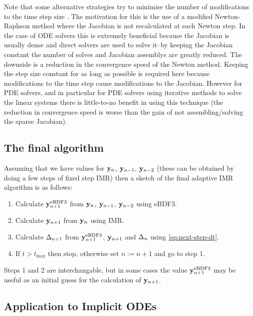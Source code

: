 Note that some alternative strategies try to minimise the number of modifications to the time step size \cite[chap. 6]{Iserles2009} \cite[Sec. 2.1]{cvode-manual}.
The motivation for this is the use of a modified Newton-Raphson method where the Jacobian is not recalculated at each Newton step.
In the case of ODE solvers this is extremely beneficial because the Jacobian is usually dense and direct solvers are used to solve it--by keeping the Jacobian constant the number of solves and Jacobian assemblys are greatly reduced.
The downside is a reduction in the convergence speed of the Newton method.
Keeping the step size constant for as long as possible is required here because modifications to the time step cause modifications to the Jacobian.
However for PDE solvers, and in particular for PDE solvers using iterative methods to solve the linear systems there is little-to-no benefit in using this technique (the reduction in convergence speed is worse than the gain of not assembling/solving the sparse Jacobian)\cite[128]{Iserles2009}.


\subsection{The final algorithm}

Assuming that we have values for $\mathbf{y}_n$, $\mathbf{y}_{n-1}$, $\mathbf{y}_{n-2}$ (these can be obtained \eg by doing a few steps of fixed step IMR) then a sketch of the final adaptive IMR algorithm is as follows:
\begin{enumerate}
\item Calculate $\mathbf{y}_{n+1}^{\text{eBDF3}}$ from $\mathbf{y}_n$, $\mathbf{y}_{n-1}$, $\mathbf{y}_{n-2}$ using eBDF3.
\item Calculate $\mathbf{y}_{n+1}$ from $\mathbf{y}_n$ using IMR.
\item Calculate $\Delta_{n+1}$ from $\mathbf{y}_{n+1}^{\text{eBDF3}}$, $\mathbf{y}_{n+1}$ and $\Delta_{n}$ using
  \eqref{eq:next-step-dt}.
\item If $t > t_{\text{max}}$ then stop, otherwise set $n := n+1$ and go to step 1.
\end{enumerate}

Steps 1 and 2 are interchangable, but in some cases the value $\mathbf{y}_{n+1}^{\text{eBDF3}}$ may be useful as an initial guess for the calculation of $\mathbf{y}_{n+1}$.


\subsection{Application to Implicit ODEs}
\label{sec:extens-impl-odes}

